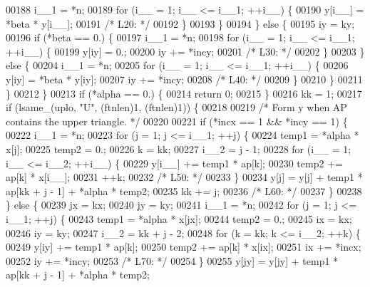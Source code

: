 \begin{DoxyCode}
00188         i\_\_1 = *n;
00189         \textcolor{keywordflow}{for} (i\_\_ = 1; i\_\_ <= i\_\_1; ++i\_\_) \{
00190             y[i\_\_] = *beta * y[i\_\_];
00191 \textcolor{comment}{/* L20: */}
00192         \}
00193         \}
00194     \} \textcolor{keywordflow}{else} \{
00195         iy = ky;
00196         \textcolor{keywordflow}{if} (*beta == 0.) \{
00197         i\_\_1 = *n;
00198         \textcolor{keywordflow}{for} (i\_\_ = 1; i\_\_ <= i\_\_1; ++i\_\_) \{
00199             y[iy] = 0.;
00200             iy += *incy;
00201 \textcolor{comment}{/* L30: */}
00202         \}
00203         \} \textcolor{keywordflow}{else} \{
00204         i\_\_1 = *n;
00205         \textcolor{keywordflow}{for} (i\_\_ = 1; i\_\_ <= i\_\_1; ++i\_\_) \{
00206             y[iy] = *beta * y[iy];
00207             iy += *incy;
00208 \textcolor{comment}{/* L40: */}
00209         \}
00210         \}
00211     \}
00212     \}
00213     \textcolor{keywordflow}{if} (*alpha == 0.) \{
00214     \textcolor{keywordflow}{return} 0;
00215     \}
00216     kk = 1;
00217     \textcolor{keywordflow}{if} (lsame\_(uplo, \textcolor{stringliteral}{"U"}, (ftnlen)1, (ftnlen)1)) \{
00218 
00219 \textcolor{comment}{/*        Form  y  when AP contains the upper triangle. */}
00220 
00221     \textcolor{keywordflow}{if} (*incx == 1 && *incy == 1) \{
00222         i\_\_1 = *n;
00223         \textcolor{keywordflow}{for} (j = 1; j <= i\_\_1; ++j) \{
00224         temp1 = *alpha * x[j];
00225         temp2 = 0.;
00226         k = kk;
00227         i\_\_2 = j - 1;
00228         \textcolor{keywordflow}{for} (i\_\_ = 1; i\_\_ <= i\_\_2; ++i\_\_) \{
00229             y[i\_\_] += temp1 * ap[k];
00230             temp2 += ap[k] * x[i\_\_];
00231             ++k;
00232 \textcolor{comment}{/* L50: */}
00233         \}
00234         y[j] = y[j] + temp1 * ap[kk + j - 1] + *alpha * temp2;
00235         kk += j;
00236 \textcolor{comment}{/* L60: */}
00237         \}
00238     \} \textcolor{keywordflow}{else} \{
00239         jx = kx;
00240         jy = ky;
00241         i\_\_1 = *n;
00242         \textcolor{keywordflow}{for} (j = 1; j <= i\_\_1; ++j) \{
00243         temp1 = *alpha * x[jx];
00244         temp2 = 0.;
00245         ix = kx;
00246         iy = ky;
00247         i\_\_2 = kk + j - 2;
00248         \textcolor{keywordflow}{for} (k = kk; k <= i\_\_2; ++k) \{
00249             y[iy] += temp1 * ap[k];
00250             temp2 += ap[k] * x[ix];
00251             ix += *incx;
00252             iy += *incy;
00253 \textcolor{comment}{/* L70: */}
00254         \}
00255         y[jy] = y[jy] + temp1 * ap[kk + j - 1] + *alpha * temp2;

\end{DoxyCode}
